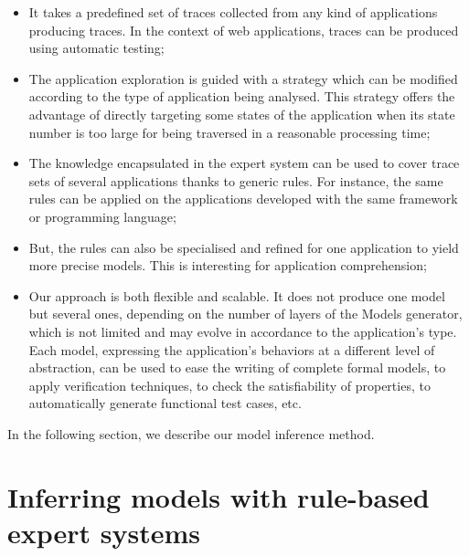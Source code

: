 \begin{itemize}
\item It takes a predefined set of traces collected from any kind
of applications producing traces. In the context of web
applications, traces can be produced using automatic testing;

\item The application exploration is guided with a strategy which
can be modified according to the type of application being
analysed. This strategy offers the advantage of directly targeting
some states of the application when its state number is too large
for being traversed in a reasonable processing time;

\item The knowledge encapsulated in the expert system can be used
to cover trace sets of several applications thanks to generic
rules. For instance, the same rules can be applied on the
applications developed with the same framework or programming
language;

\item But, the rules can also be specialised and refined for one
application to yield more precise models. This is interesting for
application comprehension;

\item Our approach is both flexible and scalable. It does not
produce one model but several ones, depending on the number of
layers of the Models generator, which is not limited and may
evolve in accordance to the application's type. Each model,
expressing the application's behaviors at a different level of
abstraction, can be used to ease the writing of complete formal
models, to apply verification techniques, to check the
satisfiability of properties, to automatically generate
functional test cases, etc.
\end{itemize}

In the following section, we describe our model inference method.


\section{Inferring models with rule-based expert systems}
\label{sec:modelinf:webapps:contrib}

